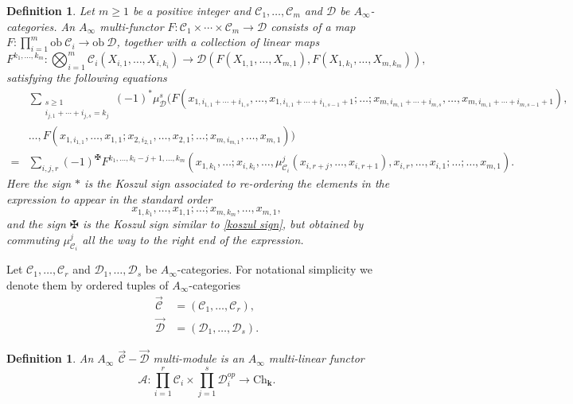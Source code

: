 \documentclass[11pt]{amsproc}
\def\K{{\mathbf{k}}}
\def\A{\mathcal{A}}
\def\cc{\mathcal{C}}
\def\dd{\mathcal{D}}
\def\mc#1{\mathcal{#1}}
\def\ainf{A_\infty}
\def\A{\mc{A}}
\def\ob{\mathrm{ob\ }}
\def\ch{\mathrm{Ch}}
\newtheorem{defn}[lem]{Definition}
\theoremstyle{remark}
\numberwithin{equation}{section}
\begin{document}
\begin{defn}
Let $m \ge 1$ be a positive integer and $\cc_{1}, \ldots, \cc_{m}$ and $\dd$ be $\ainf$-categories.
An $\ainf$ multi-functor $F: \cc_{1} \times \cdots \times \cc_{m} \to \dd$ consists of a map $F: \prod_{i=1}^{m} \ob \cc_{i} \to \ob \dd$, 
together with a collection of linear maps
\begin{equation}\label{maps of multi-functor}
F^{k_{1}, \ldots, k_{m}}: \bigotimes_{i=1}^{m} \cc_{i}(X_{i, 1}, \ldots, X_{i, k_{i}}) \to \dd(F(X_{1, 1}, \ldots, X_{m, 1}), F(X_{1, k_{1}}, \ldots, X_{m, k_{m}})),
\end{equation}
satisfying the following equations
\begin{equation}
\begin{split}
& \sum_{\substack{s \ge 1\\ i_{j, 1} + \cdots + i_{j, s} = k_{j}}} (-1)^{*}  \mu_{\dd}^{s}(F(x_{1, i_{1,1} + \cdots + i_{1, s}}, \ldots, x_{1, i_{1, 1} + \cdots + i_{1, s-1}+1}; \ldots; x_{m, i_{m,1} + \cdots + i_{m, s}}, \ldots, x_{m, i_{m,1} + \cdots + i_{m, s-1}+1}), \\
& \ldots, F(x_{1, i_{1,1}}, \ldots, x_{1,1}; x_{2, i_{2,1}}, \ldots, x_{2, 1}; \ldots; x_{m, i_{m,1}}, \ldots, x_{m, 1})) \\
= & \sum_{i, j, r}  (-1)^{\maltese} F^{k_{1}, \ldots, k_{i} - j + 1, \ldots, k_{m}}(x_{1, k_{1}}, \ldots; x_{i, k_{i}}, \ldots, \mu_{\cc_{i}}^{j}(x_{i, r+j}, \ldots, x_{i, r+1}), x_{i, r}, \ldots, x_{i, 1}; \ldots; \ldots, x_{m, 1}).
\end{split}
\end{equation}
Here the sign $*$ is the Koszul sign associated to re-ordering the elements in the expression to appear in the standard order
\[
x_{1, k_{1}}, \ldots, x_{1, 1}; \ldots; x_{m, k_{m}}, \ldots, x_{m, 1},
\]
and the sign $\maltese$ is the Koszul sign similar to \eqref{koszul sign}, 
but obtained by commuting $\mu_{\cc_{i}}^{j}$ all the way to the right end of the expression.
\end{defn}

Let $\cc_{1}, \ldots, \cc_{r}$ and $\dd_{1}, \ldots, \dd_{s}$ be $\ainf$-categories.
For notational simplicity we denote them by ordered tuples of $\ainf$-categories
\begin{align}
\overrightarrow{\cc} & = (\cc_{1}, \ldots, \cc_{r}), \\
\overrightarrow{\dd} & = (\dd_{1}, \ldots, \dd_{s}). 
\end{align}

\begin{defn}
An $\ainf$ $\overrightarrow{\cc} - \overrightarrow{\dd}$ multi-module is an $\ainf$ multi-linear functor
\begin{equation}
\A: \prod_{i=1}^{r} \cc_{i} \times \prod_{j=1}^{s} \dd^{op}_{i} \to \ch_{\K}.
\end{equation}
\end{defn}
\end{document}
